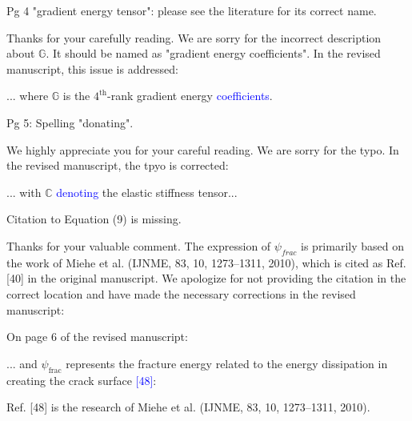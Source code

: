 \documentclass[12pt,fleqn]{article}
\begin{document}
\begin{question}{}
Pg 4 "gradient energy tensor": please see the literature for its correct name.
\end{question}

\begin{response}
Thanks for your carefully reading. We are sorry for the incorrect description about $\mathbb{G}$. It should be named as "gradient energy coefficients". In the revised manuscript, this issue is addressed:
    \begin{revised}
        ... where $\mathbb{G}$ is the $4^\mathrm{th}$-rank gradient energy \textcolor{blue}{coefficients}.
    \end{revised}
\end{response}

\begin{question}{}
Pg 5: Spelling "donating".
\end{question}
\begin{response}
We highly appreciate you for your careful reading. We are sorry for the typo. In the revised manuscript, the tpyo is corrected:
\begin{revised}
    ... with $\mathbb{C}$ \textcolor{blue}{denoting} the elastic stiffness tensor...
\end{revised} 
\end{response}

\begin{question}{}
Citation to Equation (9) is missing.
\end{question}
\begin{response}
    Thanks for your valuable comment. The expression of $\psi_{frac}$ is primarily based on the work of Miehe et al. (IJNME, 83, 10, 1273–1311, 2010), which is cited as Ref. [40] in the original manuscript. We apologize for not providing the citation in the correct location and have made the necessary corrections in the revised manuscript:

    On page 6 of the revised manuscript:
    \begin{revised}
        ... and $\psi_\mathrm{frac}$ represents the fracture energy related to the energy dissipation in creating the crack surface \textcolor{blue}{[48]}:
    \end{revised}
    Ref. [48] is the research of Miehe et al. (IJNME, 83, 10, 1273–1311, 2010). 
\end{response}
\end{document}
